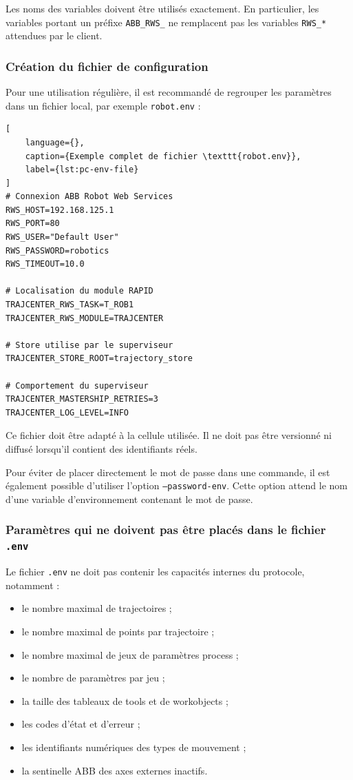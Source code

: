 \documentclass{rapportENSAM}
\begin{document}
Les noms des variables doivent être utilisés exactement. En particulier, les
variables portant un préfixe \texttt{ABB\_RWS\_} ne remplacent pas les
variables \texttt{RWS\_*} attendues par le client.

\subsubsection{Création du fichier de configuration}
\label{subsubsec:pc-env-file}

Pour une utilisation régulière, il est recommandé de regrouper les paramètres
dans un fichier local, par exemple \texttt{robot.env} :

\begin{lstlisting}[
    language={},
    caption={Exemple complet de fichier \texttt{robot.env}},
    label={lst:pc-env-file}
]
# Connexion ABB Robot Web Services
RWS_HOST=192.168.125.1
RWS_PORT=80
RWS_USER="Default User"
RWS_PASSWORD=robotics
RWS_TIMEOUT=10.0

# Localisation du module RAPID
TRAJCENTER_RWS_TASK=T_ROB1
TRAJCENTER_RWS_MODULE=TRAJCENTER

# Store utilise par le superviseur
TRAJCENTER_STORE_ROOT=trajectory_store

# Comportement du superviseur
TRAJCENTER_MASTERSHIP_RETRIES=3
TRAJCENTER_LOG_LEVEL=INFO
\end{lstlisting}

Ce fichier doit être adapté à la cellule utilisée. Il ne doit pas être
versionné ni diffusé lorsqu'il contient des identifiants réels.

Pour éviter de placer directement le mot de passe dans une commande, il est
également possible d'utiliser l'option \texttt{--password-env}. Cette option
attend le nom d'une variable d'environnement contenant le mot de passe.

\subsubsection{Paramètres qui ne doivent pas être placés dans le fichier
\texttt{.env}}
\label{subsubsec:pc-non-user-configuration}

Le fichier \texttt{.env} ne doit pas contenir les capacités internes du
protocole, notamment :

\begin{itemize}
    \item le nombre maximal de trajectoires ;
    \item le nombre maximal de points par trajectoire ;
    \item le nombre maximal de jeux de paramètres process ;
    \item le nombre de paramètres par jeu ;
    \item la taille des tableaux de tools et de workobjects ;
    \item les codes d'état et d'erreur ;
    \item les identifiants numériques des types de mouvement ;
    \item la sentinelle ABB des axes externes inactifs.
\end{itemize}
\end{document}
